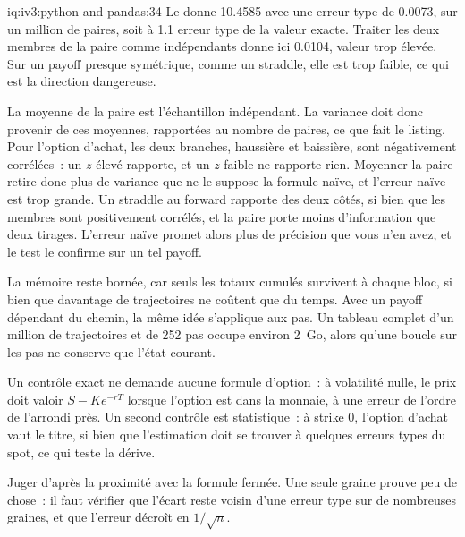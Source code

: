 \begin{solution}{iq:iv3:python-and-pandas:34}
Le  donne 10.4585 avec une erreur type de 0.0073, sur un million de paires, soit à 1.1 erreur type de la valeur exacte. Traiter les deux membres de la paire comme indépendants donne ici 0.0104, valeur trop élevée. Sur un payoff presque symétrique, comme un straddle, elle est trop faible, ce qui est la direction dangereuse.
\label{lst:iv3:pp:mc}

La moyenne de la paire est l'échantillon indépendant. La variance doit donc provenir de ces moyennes, rapportées au nombre de paires, ce que fait le listing. Pour l'option d'achat, les deux branches, haussière et baissière, sont négativement corrélées~: un $z$ élevé rapporte, et un $z$ faible ne rapporte rien. Moyenner la paire retire donc plus de variance que ne le suppose la formule naïve, et l'erreur naïve est trop grande. Un straddle au forward rapporte des deux côtés, si bien que les membres sont positivement corrélés, et la paire porte moins d'information que deux tirages. L'erreur naïve promet alors plus de précision que vous n'en avez, et le test le confirme sur un tel payoff.

La mémoire reste bornée, car seuls les totaux cumulés survivent à chaque bloc, si bien que davantage de trajectoires ne coûtent que du temps. Avec un payoff dépendant du chemin, la même idée s'applique aux pas. Un tableau complet d'un million de trajectoires et de 252 pas occupe environ 2~Go, alors qu'une boucle sur les pas ne conserve que l'état courant.

Un contrôle exact ne demande aucune formule d'option~: à volatilité nulle, le prix doit valoir $S - K e^{-rT}$ lorsque l'option est dans la monnaie, à une erreur de l'ordre de l'arrondi près. Un second contrôle est statistique~: à strike 0, l'option d'achat vaut le titre, si bien que l'estimation doit se trouver à quelques erreurs types du spot, ce qui teste la dérive.

Juger d'après la proximité avec la formule fermée. Une seule graine prouve peu de chose~: il faut vérifier que l'écart reste voisin d'une erreur type sur de nombreuses graines, et que l'erreur décroît en $1 / \sqrt{n}$.
\end{solution}

